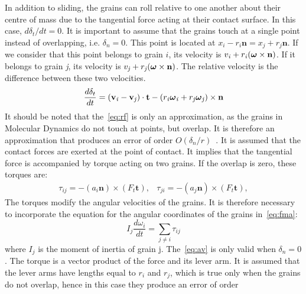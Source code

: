 In addition to sliding, the grains can roll relative to one another about their 
centre of mass due 
to the tangential force acting at their contact surface. In this case, 
$d\delta_{t}/dt=0$. It is 
important to assume that the grains touch at a single point instead of 
overlapping, i.e. 
$\delta_{n}=0$. This point is located at 
${x}_{\mathit{i}}-r_{\mathit{i}}\mathbf{n}={x}_{\mathit{j}}+r_{\mathit{j}}\mathbf{n}$.
 If we 
consider that this point belongs to grain $\mathit{i}$, its velocity is 
${v}_{\mathit{i}}+r_{\mathit{i}}(\mbox{\boldmath${\omega}$}\times\mathbf{n})$. 
If it belongs to 
grain \textit{j}, its velocity is 
${v}_{\mathit{j}}+r_{\mathit{j}}(\mbox{\boldmath${\omega}$}\times\mathbf{n})$. 
The relative 
velocity is the difference between these two velocities. 
\begin{equation}
\frac{d\delta_{t}}{dt}=(\mathbf{v}_{\mathit{i}}-{\mathbf{v}}_{\mathit{j}})\cdot 
\mathbf{t} 
-(r_{\mathit{i}} \mbox{\boldmath${\omega}$}_{\mathit{i}}
+r_{\mathit{j}}\mbox{\boldmath${\omega}$}_{\mathit{j}})\times\mathbf{n} 
\label{eq:rf}
\end{equation}
It should be noted that the~\cref{eq:rf} is only an approximation, as the 
grains in Molecular 
Dynamics do not touch at points, but overlap. It is therefore an approximation 
that produces an 
error of order $\mathbf{\mathit{O}}(\delta_{n}/r)$~\citep{Radjai2011}. It is 
assumed that the 
contact forces are exerted at the point of contact. It implies that the 
tangential force is 
accompanied by torque acting on two grains. If the overlap is zero, these 
torques are:
\begin{align}
\tau_{\mathit{ij}}=-(a_{\mathit{i}}\mathbf{n})\times(F_{t}\mathbf{t}), & 
\tau_{\mathit{ji}}=-(a_{\mathit{j}}\mathbf{n})\times(F_{t}\mathbf{t}),
\label{eq:av}
\end{align}
The torques modify the angular velocities of the grains. It is therefore 
necessary to incorporate 
the equation for the angular coordinates of the grains in~\cref{eq:fma}:
\begin{equation}
\mathit{I}_{j}\frac{d\omega_{i}}{dt}=\sum\limits_{j\ne i}{\tau_{ij}}
\end{equation}
where $\mathit{I}_{j}$ is the moment of inertia of grain j. The~\cref{eq:av} is 
only valid when 
$\delta_{n}=0$. The torque is a vector product of the force and its lever arm. 
It is assumed that 
the lever arms have lengths equal to $r_{\mathit{i}}$ and $r_{\mathit{j}}$, 
which is true only 
when 
the grains do not overlap, hence in this case they produce an error of order 
